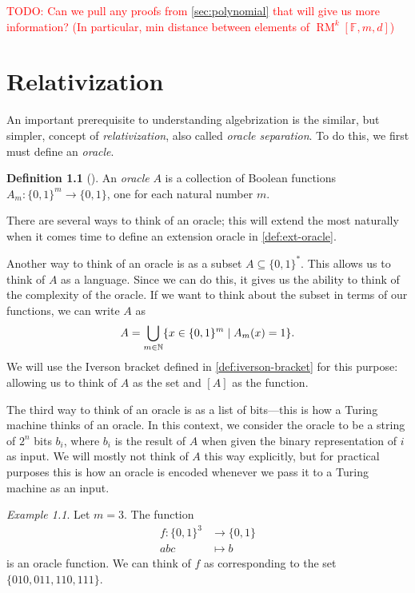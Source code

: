 \documentclass[english,12pt]{reedthesis}
\theoremstyle{plain}
\theoremstyle{definition}
\newtheorem{defn}[defn]{Definition}
\theoremstyle{remark}
\newtheorem{example}{Example}[thm]
\DeclareMathOperator{\RM}{RM}
\newcommand{\TODO}[1]{\textcolor{red}{TODO: #1}}
\begin{document}
\TODO{Can we pull any proofs from \cref{sec:polynomial} that will give us more
  information? (In particular, min distance between elements of
  $\RM^{k}[\mathbb{F}, m, d]$)}

\chapter{Relativization}


An important prerequisite to understanding algebrization is the similar, but
simpler, concept of \emph{relativization}, also called \emph{oracle separation}.
To do this, we first must define an \emph{oracle}.
\begin{defn}[{\cite[Def.\ 2.1]{AW09}}]\label{def:oracle}
  An \emph{oracle} $A$ is a collection of Boolean functions
  $A_{m}\colon \{0, 1\}^{m} \rightarrow \{0, 1\}$, one for each natural number $m$.
\end{defn}
There are several ways to think of an oracle; this will extend the most
naturally when it comes time to define an extension oracle in
\cref{def:ext-oracle}.

Another way to think of an oracle is as a subset $A \subseteq \{0, 1\}^{*}$. This allows
us to think of $A$ as a language. Since we can do this, it gives us the ability
to think of the complexity of the oracle. If we want to think about the subset
in terms of our functions, we can write $A$ as
\begin{equation}
  A = \bigcup_{m \in \mathbb{N}}\mleft\{x \in \{0, 1\}^{m} \mid A_{m}(x) = 1\mright\}.
\end{equation}
We will use the Iverson bracket defined in \cref{def:iverson-bracket} for this
purpose: allowing us to think of $A$ as the set and $[A]$ as the function.

The third way to think of an oracle is as a list of bits---this is how a Turing
machine thinks of an oracle. In this context, we consider the oracle to be a
string of $2^{n}$ bits $b_{i}$, where $b_{i}$ is the result of $A$ when given
the binary representation of $i$ as input. We will mostly not think of $A$ this
way explicitly, but for practical purposes this is how an oracle is encoded
whenever we pass it to a Turing machine as an input.

\begin{example}\label{ex:oracle-function}
  Let $m = 3$. The function
  \begin{equation}
    \begin{aligned}
      f\colon \{0, 1\}^{3} &\rightarrow \{0, 1\} \\
      abc &\mapsto b
    \end{aligned}
  \end{equation}
  is an oracle function. We can think of $f$ as corresponding to the set
  $\{010, 011, 110, 111\}$.
\end{example}
\end{document}
